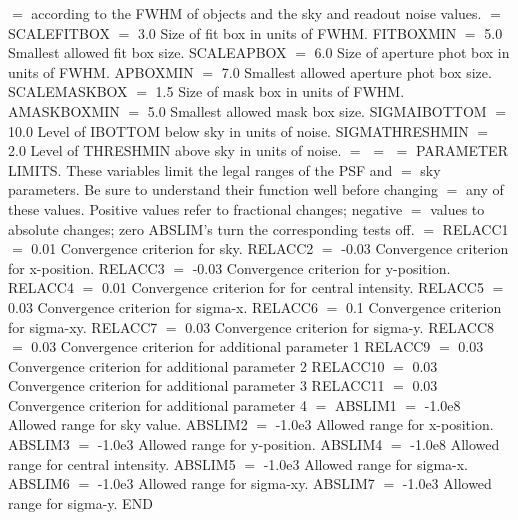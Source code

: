 {{$=$  according to the FWHM of objects and the sky and readout noise values.
$=$
SCALEFITBOX $=$ 3.0      Size of fit box in units of FWHM.
FITBOXMIN $=$ 5.0        Smallest allowed fit box size.
SCALEAPBOX $=$ 6.0       Size of aperture phot box in units of FWHM.
APBOXMIN $=$ 7.0         Smallest allowed aperture phot box size.
SCALEMASKBOX $=$ 1.5     Size of mask box in units of FWHM.
AMASKBOXMIN $=$ 5.0      Smallest allowed mask box size.
SIGMAIBOTTOM $=$ 10.0    Level of IBOTTOM below sky in units of noise.
SIGMATHRESHMIN $=$ 2.0   Level of THRESHMIN above sky in units of noise.
$=$
$=$
$=$  PARAMETER LIMITS.  These variables limit the legal ranges of the PSF and
$=$  sky parameters.  Be sure to understand their function well before changing
$=$  any of these values.  Positive values refer to fractional changes; negative
$=$  values to absolute changes; zero ABSLIM's turn the corresponding tests off.
$=$
RELACC1 $=$ 0.01         Convergence criterion for sky.
RELACC2 $=$ -0.03        Convergence criterion for x-position.
RELACC3 $=$ -0.03        Convergence criterion for y-position.
RELACC4 $=$ 0.01         Convergence criterion for for central intensity.
RELACC5 $=$ 0.03         Convergence criterion for sigma-x.
RELACC6 $=$ 0.1          Convergence criterion for sigma-xy.
RELACC7 $=$ 0.03         Convergence criterion for sigma-y.
RELACC8 $=$ 0.03         Convergence criterion for additional parameter 1
RELACC9 $=$ 0.03         Convergence criterion for additional parameter 2
RELACC10 $=$ 0.03        Convergence criterion for additional parameter 3
RELACC11 $=$ 0.03        Convergence criterion for additional parameter 4
$=$
ABSLIM1 $=$ -1.0e8       Allowed range for sky value.
ABSLIM2 $=$ -1.0e3       Allowed range for x-position.
ABSLIM3 $=$ -1.0e3       Allowed range for y-position.
ABSLIM4 $=$ -1.0e8       Allowed range for central intensity.
ABSLIM5 $=$ -1.0e3       Allowed range for sigma-x.
ABSLIM6 $=$ -1.0e3       Allowed range for sigma-xy.
ABSLIM7 $=$ -1.0e3       Allowed range for sigma-y.
END
}
}
\vfill
\eject